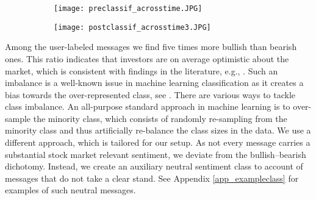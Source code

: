 \begin{figure}[h]
\centering
\begin{subfigure}{0.49\textwidth}
\centering
\texttt{[image: preclassif\_acrosstime.JPG]}
\end{subfigure}
\begin{subfigure}{0.49\textwidth}
\centering
        \texttt{[image: postclassif\_acrosstime3.JPG]}
\end{subfigure}


    \label{fig:classif_time}

\end{figure}

Among the user-labeled messages we find five times more bullish than bearish ones. This ratio indicates that investors are on average optimistic about the market, which is consistent with findings in the literature, e.g., \citet{renault2017intraday}. Such an imbalance is a well-known issue in machine learning classification as it creates a bias towards the over-represented class, see \citet{chawla2004special}. There are various ways to tackle class imbalance. An all-purpose standard approach in machine learning is to over-sample the minority class, which consists of randomly re-sampling from the minority class and thus artificially re-balance the class sizes in the data. We use a different approach, which is tailored for our setup. As not every message carries a substantial stock market relevant sentiment, we deviate from the bullish--bearish dichotomy. Instead, we create an auxiliary neutral sentiment class to account of messages that do not take a clear stand. See Appendix \ref{app_exampleclass} for examples of such neutral messages.

